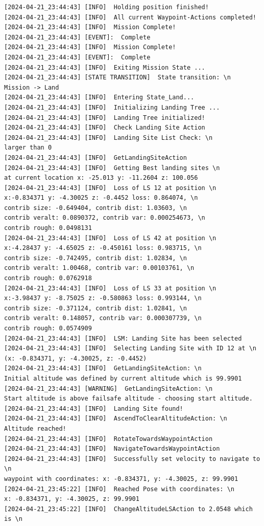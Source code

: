 \begin{lstlisting}
[2024-04-21_23:44:43] [INFO]  Holding position finished!
[2024-04-21_23:44:43] [INFO]  All current Waypoint-Actions completed!
[2024-04-21_23:44:43] [INFO]  Mission Complete!
[2024-04-21_23:44:43] [EVENT]:  Complete
[2024-04-21_23:44:43] [INFO]  Mission Complete!
[2024-04-21_23:44:43] [EVENT]:  Complete
[2024-04-21_23:44:43] [INFO]  Exiting Mission State ...
[2024-04-21_23:44:43] [STATE TRANSITION]  State transition: \n 
Mission -> Land
[2024-04-21_23:44:43] [INFO]  Entering State_Land...
[2024-04-21_23:44:43] [INFO]  Initializing Landing Tree ...
[2024-04-21_23:44:43] [INFO]  Landing Tree initialized!
[2024-04-21_23:44:43] [INFO]  Check Landing Site Action
[2024-04-21_23:44:43] [INFO]  Landing Site List Check: \n 
larger than 0
[2024-04-21_23:44:43] [INFO]  GetLandingSiteAction
[2024-04-21_23:44:43] [INFO]  Getting Best landing sites \n 
at current location x: -25.013 y: -11.2604 z: 100.056
[2024-04-21_23:44:43] [INFO]  Loss of LS 12 at position \n 
x:-0.834371 y: -4.30025 z: -0.4452 loss: 0.864074, \n 
contrib size: -0.649404, contrib dist: 1.03603, \n 
contrib veralt: 0.0890372, contrib var: 0.000254673, \n 
contrib rough: 0.0498131
[2024-04-21_23:44:43] [INFO]  Loss of LS 42 at position \n 
x:-4.28437 y: -4.65025 z: -0.450161 loss: 0.983715, \n 
contrib size: -0.742495, contrib dist: 1.02834, \n 
contrib veralt: 1.00468, contrib var: 0.00103761, \n 
contrib rough: 0.0762918
[2024-04-21_23:44:43] [INFO]  Loss of LS 33 at position \n 
x:-3.98437 y: -8.75025 z: -0.580863 loss: 0.993144, \n 
contrib size: -0.371124, contrib dist: 1.02841, \n 
contrib veralt: 0.148057, contrib var: 0.000307739, \n 
contrib rough: 0.0574909
[2024-04-21_23:44:43] [INFO]  LSM: Landing Site has been selected
[2024-04-21_23:44:43] [INFO]  Selecting Landing Site with ID 12 at \n 
(x: -0.834371, y: -4.30025, z: -0.4452)
[2024-04-21_23:44:43] [INFO]  GetLandingSiteAction: \n 
Initial altitude was defined by current altitude which is 99.9901
[2024-04-21_23:44:43] [WARNING]  GetLandingSiteAction: \n 
Start altitude is above failsafe altitude - choosing start altitude.
[2024-04-21_23:44:43] [INFO]  Landing Site found!
[2024-04-21_23:44:43] [INFO]  AscendToClearAltitudeAction: \n 
Altitude reached!
[2024-04-21_23:44:43] [INFO]  RotateTowardsWaypointAction
[2024-04-21_23:44:43] [INFO]  NavigateTowardsWaypointAction
[2024-04-21_23:44:43] [INFO]  Successfully set velocity to navigate to \n 
waypoint with coordinates: x: -0.834371, y: -4.30025, z: 99.9901
[2024-04-21_23:45:22] [INFO]  Reached Pose with coordinates: \n 
x: -0.834371, y: -4.30025, z: 99.9901
[2024-04-21_23:45:22] [INFO]  ChangeAltitudeLSAction to 2.0548 which is \n 

\end{lstlisting}
